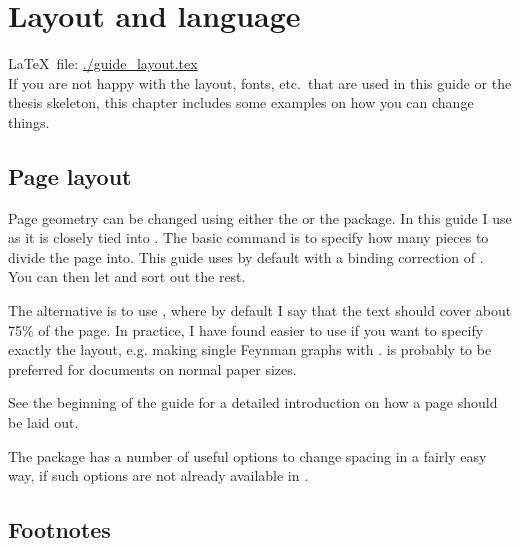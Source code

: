 \chapter{Layout and language}
\label{sec:layout}

\LaTeX\ file: \url{./guide_layout.tex}\\[1ex]
\noindent
If you are not happy with the layout, fonts, etc.\ that are used in
this guide or the thesis skeleton, this chapter includes some examples
on how you can change things.


\section{Page layout}
\label{sec:layout:page}


Page geometry can be changed using either the
 or the 
package. In this guide I use  as it is closely tied
into \KOMAScript. The basic command is to specify how many pieces to
divide the page into. This guide uses  by default with
a binding correction of .  You can then let
\KOMAScript{} and  sort out the rest.

The alternative is to use , where by default I say
that the text should cover about 75\% of the page. In practice, I have
found  easier to use if you want to specify exactly
the layout, e.g. making single Feynman graphs with
.  is probably to be preferred for
documents on normal paper sizes.

See the beginning of the \KOMAScript{} guide for a detailed
introduction on how a page should be laid out.

The  package has a number of useful options to change
spacing in a fairly easy way, if such options are not already
available in \KOMAScript.


\section{Footnotes}
\label{sec:layout:footnote}

